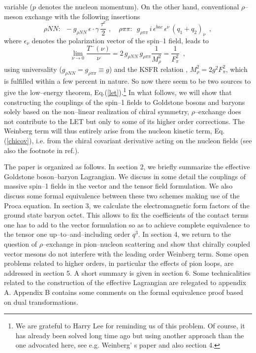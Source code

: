 variable ($p$ denotes the nucleon momentum).
On the other hand, conventional $\rho$--meson exchange with
the following insertions
\begin{equation}
\rho NN: \, \, \,  -g_{\rho NN} \, \epsilon \cdot \gamma \,\frac{\tau^c}{2}
\, \, , \quad
\rho \pi \pi: \, \, \, g_{\rho \pi \pi} \, i \, \epsilon^{bac} \, \epsilon^\nu
\, (q_1 + q_2)_\nu \, \, \,  ,
\label{rhocoup}
\end{equation}
where $\epsilon_\nu$ denotes the polarization vector of the spin--1
field, leads to
\begin{equation}
\lim_{\nu \to 0} \frac{T^-(\nu )}{ \nu } = 2 \, g_{\rho NN} \,
g_{\rho \pi \pi} \frac{1}{M_\rho^2} = \frac{1}{F_\pi^2} \, \, \, ,
\label{rhowein}
\end{equation}
using universality ($g_{\rho NN} = g_{\rho \pi \pi} \equiv g$) and the KSFR
relation \cite{kfsr}, $M_\rho^2 = 2 g^2 F_\pi^2$, which is fulfilled
within a few percent in nature. So now there seem to be two sources to give
the low--energy theorem, Eq.(\ref{let}).\footnote{We are grateful to
Harry Lee for reminding us of this problem. Of course, it has already
been solved long time ago but using another approach than the one
advocated here, see e.g. Weinberg' s paper \cite{weinnon} and also
section 4.}  In what follows, we will show
that constructing the couplings of the spin--1 fields to Goldstone
bosons and baryons solely based on the non--linear
realization of chiral symmetry, $\rho$--exchange does not contribute to
the LET but only to some of its higher order corrections. The Weinberg
term will thus entirely arise from the nucleon kinetic term,
Eq.(\ref{chicov}), i.e. from the chiral covariant derivative acting on
the nucleon fields (see also the footnote in ref.\cite{bkmpin}).

The paper is organized as follows. In section 2, we briefly summarize
the effective Goldstone boson--baryon Lagrangian. We discuss in some
detail the couplings of massive spin--1 fields in the vector and the
tensor field formulation. We also discuss some formal equivalence
between these two schemes making use of the Proca equation. In section
3, we calculate the electromagnetic form factors of the ground state
baryon octet. This allows to fix the coefficients of the contact terms
one has to add to the vector formulation so as to achieve complete
equivalence to the tensor one up--to--and--including order $q^3$. In
section 4, we return to the question of $\rho$--exchange in
pion--nucleon scattering and show that chirally coupled vector mesons
do not interfere with the leading order Weinberg term. Some open
problems related to higher orders, in particular the effects of pion
loops,  are addressed in section 5. A short
summary is given in section 6. Some technicalities related to the
construction of the effective Lagrangian are relegated to appendix A.
Appendix B contains some comments on the formal equivalence proof
based on dual transformations.

